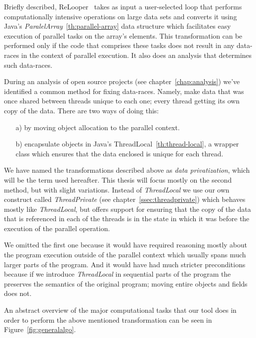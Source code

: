 Briefly described, ReLooper~\cite{ReLooper} takes as input a user-selected loop
that performs computationally intensive operations on large data sets and
converts it using Java's \emph{ParalelArray}~\ref{th:parallel-array} data
structure which facilitates easy execution of parallel tasks on the array's
elements. This transformation can be performed only if the code that comprises
these tasks does not result in any data-races in the context of parallel
execution. It also does an analysis that determines such data-races.


During an analysis of open source projects (see chapter~\ref{chap:analysis})
we've identified a common method for fixing data-races. Namely, make
data that was once shared between threads unique to each one; every thread getting its
own copy of the data. There are two ways of doing this:
\begin{enumerate} 
  \item [a)] by moving object allocation to the parallel context.
  \item [b)] encapsulate objects in Java's ThreadLocal~\ref{th:thread-local}, a wrapper
  class which ensures that the data enclosed is unique for each thread.
\end{enumerate}

We have named the transformations described above as \emph{data privatization},
which will be the term used hereafter. This thesis will focus mostly on the
second method, but with slight variations. Instead of \emph{ThreadLocal} we use
our own construct called \emph{ThreadPrivate} (see
chapter~\ref{ssec:threadprivate}) which behaves mostly like \emph{ThreadLocal},
but offers support for ensuring that the copy of the data that is referenced in
each of the threads is in the state in which it was before the execution of the
parallel operation.

We omitted the first one because it would have required reasoning mostly about
the program execution outside of the parallel context which usually spans much
larger parts of the program. And it would have had much stricter preconditions
because if we introduce \emph{ThreadLocal} in sequential parts of the program
the preserves the semantics of the original program; moving entire objects and
fields does not.

An abstract overview of the major computational tasks that our tool does in
order to perform the above mentioned transformation can be seen in
Figure~\ref{fig:generalalgo}.

